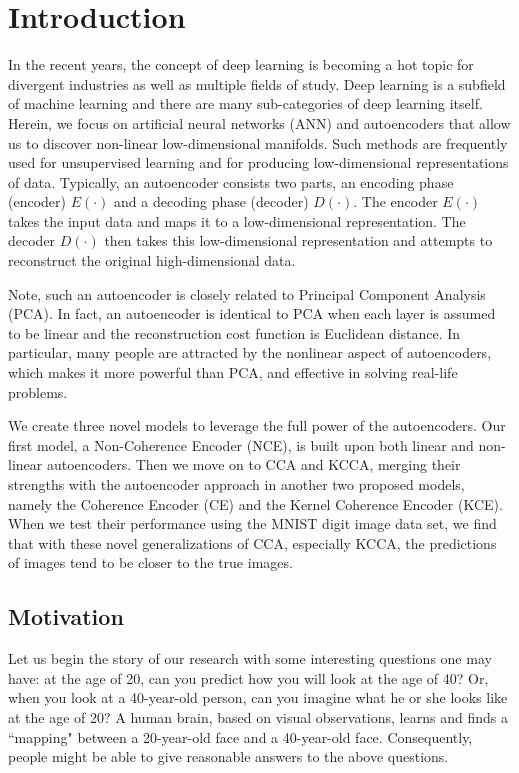 \documentclass[12pt]{report} %
\begin{document}
\chapter{Introduction}
In the recent years, the concept of deep learning\cite{DL} is becoming a hot topic for divergent industries as well as multiple fields of study\cite{AUKM,TF,PR,DLRG}. Deep learning is a subfield of machine learning and there are many sub-categories of deep learning itself. Herein, we focus on artificial neural networks (ANN)\cite{NN,NN2} and autoencoders\cite{AE,AE2,AE3} that allow us to discover non-linear low-dimensional manifolds. Such methods are frequently used for unsupervised learning and for producing low-dimensional representations of data. Typically, an autoencoder consists two parts, an encoding phase (encoder) \(E(\cdot)\) and a decoding phase (decoder) \(D(\cdot)\). The encoder \(E(\cdot)\) takes the input data and maps it to a low-dimensional representation. The decoder \(D(\cdot)\) then takes this low-dimensional representation and attempts to reconstruct the original high-dimensional data.

Note, such an autoencoder is closely related to Principal Component Analysis (PCA)\cite{PCA,PCA2,STAT,KPCA}. In fact, an autoencoder is identical to PCA when each layer is assumed to be linear and the reconstruction cost function is Euclidean distance. In particular, many people are attracted by the nonlinear aspect of autoencoders, which makes it more powerful than PCA, and effective in solving real-life problems.

We create three novel models to leverage the full power of the autoencoders. Our first model, a Non-Coherence Encoder (NCE), is built upon both linear and non-linear autoencoders. Then we move on to CCA\cite{CCA,ECCA} and KCCA\cite{KCCA}, merging their strengths with the autoencoder approach in another two proposed models, namely the Coherence Encoder (CE) and the Kernel Coherence Encoder (KCE). When we test their performance using the MNIST\cite{MNIST} digit image data set, we find that with these novel generalizations of CCA, especially KCCA, the predictions of images tend to be closer to the true images. 

\section{Motivation}
Let us begin the story of our research with some interesting questions one may have: at the age of 20, can you predict how you will look at the age of 40? Or, when you look at a 40-year-old person, can you imagine what he or she looks like at the age of 20? A human brain, based on visual observations, learns and finds a ``mapping" between a 20-year-old face and a 40-year-old face. Consequently, people might be able to give reasonable answers to the above questions.
\end{document}
